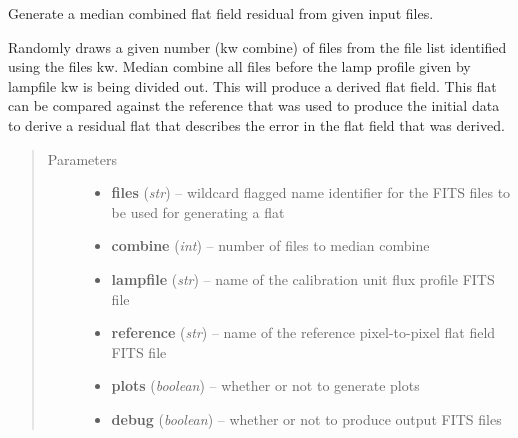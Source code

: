 \documentclass[a4paper,11pt,english]{sphinxmanual}
\begin{document}

\begin{fulllineitems}
\label{reduction:analysis.FlatfieldCalibration.generateResidualFlatField}
Generate a median combined flat field residual from given input files.

Randomly draws a given number (kw combine) of files from the file list identified using the files kw.
Median combine all files before the lamp profile given by lampfile kw is being divided out. This
will produce a derived flat field. This flat can be compared against the reference that was used
to produce the initial data to derive a residual flat that describes the error in the flat field
that was derived.
\begin{quote}\begin{description}
\item[{Parameters}] \leavevmode\begin{itemize}
\item {} 
\textbf{files} (\emph{str}) -- wildcard flagged name identifier for the FITS files to be used for generating a flat

\item {} 
\textbf{combine} (\emph{int}) -- number of files to median combine

\item {} 
\textbf{lampfile} (\emph{str}) -- name of the calibration unit flux profile FITS file

\item {} 
\textbf{reference} (\emph{str}) -- name of the reference pixel-to-pixel flat field FITS file

\item {} 
\textbf{plots} (\emph{boolean}) -- whether or not to generate plots

\item {} 
\textbf{debug} (\emph{boolean}) -- whether or not to produce output FITS files

\end{itemize}

\end{description}\end{quote}


\end{fulllineitems}
\end{document}
